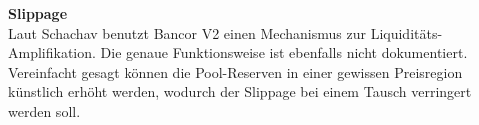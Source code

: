 \documentclass[12pt,a4paper,titlepage,oneside,english]{article}
\begin{document}

\textbf{Slippage}\\
Laut Schachav benutzt Bancor V2 einen Mechanismus zur Liquiditäts-Amplifikation. Die genaue Funktionsweise ist ebenfalls nicht dokumentiert. Vereinfacht gesagt können die Pool-Reserven in einer gewissen Preisregion künstlich erhöht werden, wodurch der Slippage bei einem Tausch verringert werden soll. \citep{Shachav2020}

\end{document}
